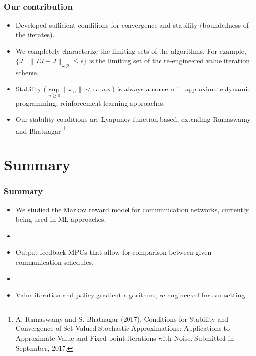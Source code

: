 \documentclass{beamer}
\begin{document}
\begin{frame}
 \frametitle{Our contribution}
 \begin{itemize}
\item Developed sufficient conditions for convergence and stability (boundedness of the iterates). 
  \item We completely characterize the limiting sets of the algorithms. For example,
  {\color{purple}$\{J \mid \lVert TJ - J \rVert_{\omega, p} \le \epsilon \}$} is the limiting set of the
  re-engineered value iteration scheme.
\item Stability ($\sup \limits_{n \ge 0} \lVert x_n \rVert < \infty$ a.s.) is always a concern in approximate dynamic programming, reinforcement learning approaches.
  \item Our stability conditions are Lyapunov function based, extending Ramaswamy and Bhatnagar
  \footnote{{\color{purple} \footnotesize A. Ramaswamy and S. Bhatnagar (2017).
 Conditions for Stability and Convergence of
Set-Valued Stochastic Approximations: Applications to Approximate Value and Fixed
point Iterations with Noise. Submitted in September, 2017.}}
 \end{itemize}
\end{frame}
\section{Summary}
\begin{frame}
 \frametitle{Summary}
 \begin{itemize}
 \item We studied the Markov reward model for communication networks, currently being used in ML
 approaches.
 \item[]
 \item Output feedback MPCs that allow for comparison between given communication schedules.
 \item[]
 \item Value iteration and policy gradient algorithms, re-engineered for our setting.
 \end{itemize}
\end{frame}
\end{document}

